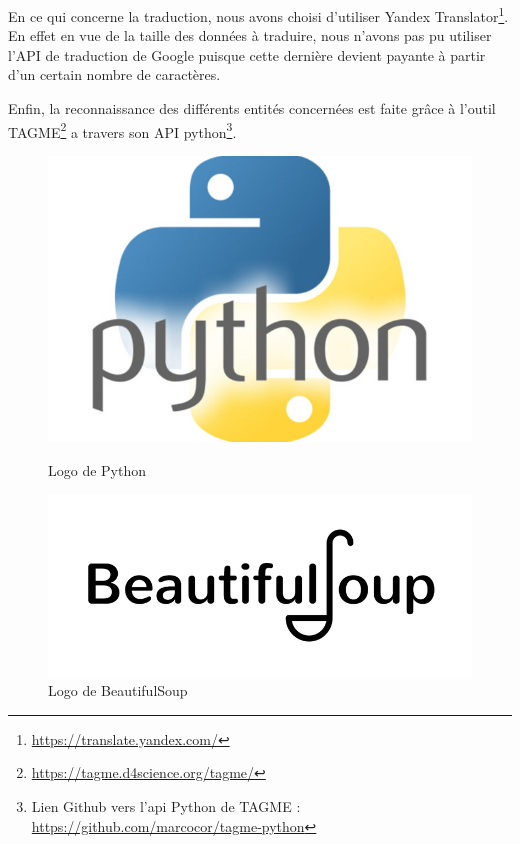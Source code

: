 \documentclass[oneside,13pt,a4paper]{report}
\begin{document}
En ce qui concerne la traduction, nous avons choisi d'utiliser Yandex Translator\footnote{\url{https://translate.yandex.com/}}. En effet en vue de la taille des données à traduire, nous n'avons pas pu utiliser l'API de traduction de Google puisque cette dernière devient payante à partir d'un certain nombre de caractères.

Enfin, la reconnaissance des différents entités concernées est faite grâce à l'outil TAGME\footnote{\url{https://tagme.d4science.org/tagme/}} a travers son API python\footnote{Lien Github vers l'api Python de TAGME : \url{https://github.com/marcocor/tagme-python}}.

\vspace{2cm}
\begin{figure}[h]
	\begin{minipage}[c]{.30\linewidth}
		\centering
		\includegraphics[width=1\textwidth]{img/python.jpg}
		\caption{Logo de Python}
	\end{minipage}
	\hfill%
	\begin{minipage}[c]{.30\linewidth}
		\centering
		\includegraphics[width=1\textwidth]{img/bs.png}
		\caption{Logo de BeautifulSoup}

\end{minipage}
\end{figure}
\end{document}
